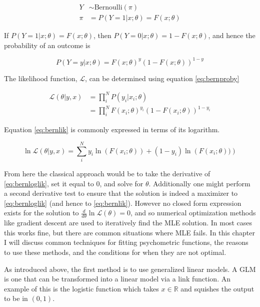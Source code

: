 \documentclass[11pt, oneside]{book}
\begin{document}
\begin{align*}
Y &\sim \textrm{Bernoulli}(\pi) \\
\pi &= P(Y=1 \vert x; \theta) = F(x; \theta)
\end{align*}

If \(P(Y=1 | x; \theta) = F(x;\theta)\), then \(P(Y = 0 | x; \theta) = 1 - F(x;\theta)\), and hence the probability of an outcome is

\begin{equation}
  P(Y=y | x; \theta) = F(x;\theta)^y(1-F(x;\theta))^{1-y}
  \label{eq:bernproby}
\end{equation}

The likelihood function, \(\mathcal{L}\), can be determined using equation \eqref{eq:bernproby}

\begin{equation}
  \begin{split}
    \mathcal{L}(\theta | y, x) &= \prod_{i}^{N} P(y_i | x_i; \theta) \\
    &= \prod_{i}^{N}F(x_i;\theta)^{y_i}(1-F(x_i;\theta))^{1-y_i}
  \end{split}
  \label{eq:bernlik}
\end{equation}

Equation \eqref{eq:bernlik} is commonly expressed in terms of its logarithm.

\begin{equation}
  \ln \mathcal{L}(\theta | y, x) = \sum_{i}^{N} y_i \ln\left(F(x_i;\theta)\right) + (1-y_i) \ln\left(F(x_i;\theta))\right)
  \label{eq:bernloglik}
\end{equation}

From here the classical approach would be to take the derivative of \eqref{eq:bernloglik}, set it equal to \(0\), and solve for \(\theta\). Additionally one might perform a second derivative test to ensure that the solution is indeed a maximizer to \eqref{eq:bernloglik} (and hence to \eqref{eq:bernlik}). However no closed form expression exists for the solution to \(\frac{d}{d\theta} \ln \mathcal{L}(\theta) = 0\), and so numerical optimization methods like gradient descent are used to iteratively find the MLE solution. In most cases this works fine, but there are common situations where MLE fails. In this chapter I will discuss common techniques for fitting psychometric functions, the reasons to use these methods, and the conditions for when they are not optimal.

As introduced above, the first method is to use generalized linear models. A GLM is one that can be transformed into a linear model via a link function. An example of this is the logistic function which takes \(x \in \mathbb{R}\) and squishes the output to be in \((0, 1)\).
\end{document}
